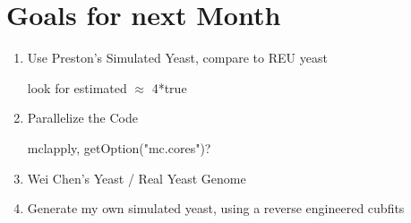 \section{Goals for next Month}
\begin{enumerate}
\item Use Preston's Simulated Yeast, compare to REU yeast 

look for estimated $\approx$ 4*true
\item Parallelize the Code 

mclapply, getOption("mc.cores")?
\item Wei Chen's Yeast / Real Yeast Genome
\item Generate my own simulated yeast, using a reverse engineered cubfits
\end{enumerate}


